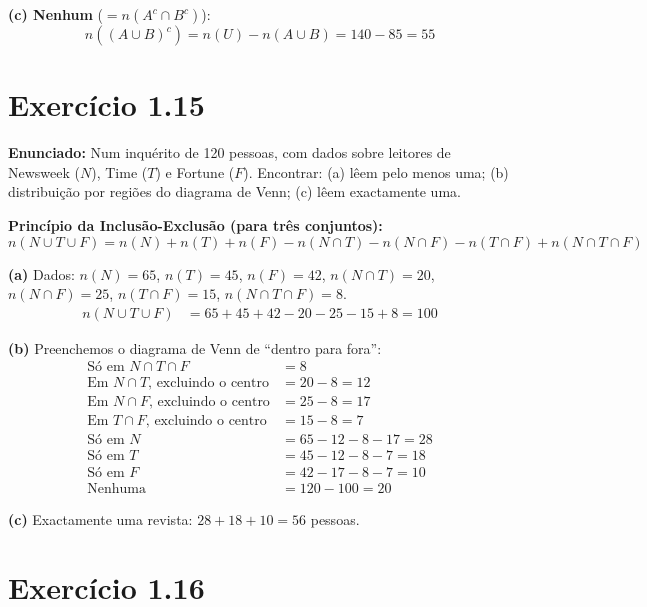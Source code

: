 \documentclass[12pt,a4paper]{article}
\begin{document}
\textbf{(c) Nenhum} ($= n(A^c \cap B^c)$):
\[
n((A \cup B)^c) = n(U) - n(A \cup B) = 140 - 85 = 55
\]

\section*{Exercício 1.15}

\textbf{Enunciado:} Num inquérito de 120 pessoas, com dados sobre leitores de Newsweek ($N$), Time ($T$) e Fortune ($F$). Encontrar: (a) lêem pelo menos uma; (b) distribuição por regiões do diagrama de Venn; (c) lêem exactamente uma.

\begin{teoribox}
\textbf{Princípio da Inclusão-Exclusão (para três conjuntos):}
\[
n(N \cup T \cup F) = n(N) + n(T) + n(F) - n(N \cap T) - n(N \cap F) - n(T \cap F) + n(N \cap T \cap F)
\]
\end{teoribox}

\textbf{(a)} Dados: $n(N)=65$, $n(T)=45$, $n(F)=42$, $n(N\cap T)=20$, $n(N\cap F)=25$, $n(T\cap F)=15$, $n(N\cap T\cap F)=8$.
\begin{align*}
n(N \cup T \cup F) &= 65 + 45 + 42 - 20 - 25 - 15 + 8 = 100
\end{align*}

\textbf{(b)} Preenchemos o diagrama de Venn de ``dentro para fora'':
\begin{align*}
\text{Só em } N \cap T \cap F &= 8 \\
\text{Em } N \cap T \text{, excluindo o centro} &= 20 - 8 = 12 \\
\text{Em } N \cap F \text{, excluindo o centro} &= 25 - 8 = 17 \\
\text{Em } T \cap F \text{, excluindo o centro} &= 15 - 8 = 7 \\
\text{Só em } N &= 65 - 12 - 8 - 17 = 28 \\
\text{Só em } T &= 45 - 12 - 8 - 7 = 18 \\
\text{Só em } F &= 42 - 17 - 8 - 7 = 10 \\
\text{Nenhuma} &= 120 - 100 = 20
\end{align*}

\textbf{(c)} Exactamente uma revista: $28 + 18 + 10 = 56$ pessoas.

\section*{Exercício 1.16}
\end{document}
